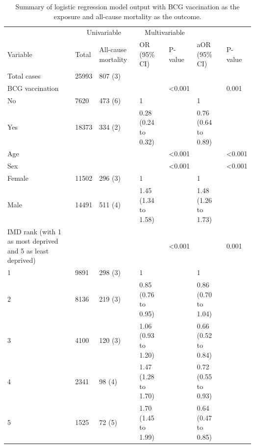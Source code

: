 \documentclass[11pt,twoside]{bristolthesis}
\begin{document}
  \begin{table}[H]
  
  \caption{\label{tab:06-bcg-mortality}Summary of logistic regression model output with BCG vaccination as the exposure and all-cause mortality as the outcome.}
  \centering
  \fontsize{8}{10}\selectfont
  \begin{tabular}{>{\raggedright\arraybackslash}p{3cm}llllll}
  \toprule
  \multicolumn{3}{c}{ } & \multicolumn{2}{c}{Univariable} & \multicolumn{2}{c}{Multivariable} \\
  \cmidrule(l{3pt}r{3pt}){4-5} \cmidrule(l{3pt}r{3pt}){6-7}
  Variable & Total & All-cause mortality & OR (95\% CI) & P-value & aOR (95\% CI) & P-value\\
  \midrule
  Total cases & 25993 & 807 (3) &  &  &  & \\
  BCG vaccination &  &  &  & <0.001 &  & 0.001\\
  \hspace{1em}No & 7620 & 473 (6) & 1 &  & 1 & \\
  \hspace{1em}Yes & 18373 & 334 (2) & 0.28 (0.24 to 0.32) &  & 0.76 (0.64 to 0.89) & \\
  Age &  &  &  & <0.001 &  & <0.001\\
  \addlinespace
  Sex &  &  &  & <0.001 &  & <0.001\\
  \hspace{1em}Female & 11502 & 296 (3) & 1 &  & 1 & \\
  \hspace{1em}Male & 14491 & 511 (4) & 1.45 (1.34 to 1.58) &  & 1.48 (1.26 to 1.73) & \\
  IMD rank (with 1 as most deprived and 5 as least deprived) &  &  &  & <0.001 &  & 0.001\\
  \hspace{1em}1 & 9891 & 298 (3) & 1 &  & 1 & \\
  \addlinespace
  \hspace{1em}2 & 8136 & 219 (3) & 0.85 (0.76 to 0.95) &  & 0.86 (0.70 to 1.04) & \\
  \hspace{1em}3 & 4100 & 120 (3) & 1.06 (0.93 to 1.20) &  & 0.66 (0.52 to 0.84) & \\
  \hspace{1em}4 & 2341 & 98 (4) & 1.47 (1.28 to 1.70) &  & 0.72 (0.55 to 0.93) & \\
  \hspace{1em}5 & 1525 & 72 (5) & 1.70 (1.45 to 1.99) &  & 0.64 (0.47 to 0.85) & \\

\end{tabular}
\end{table}
\end{document}

